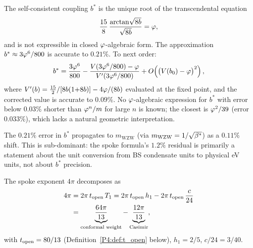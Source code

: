 \begin{proposition}
\label{P4:prop:bstar}
The self-consistent coupling $b^*$ is the unique root of the
transcendental equation
\begin{equation}
  \frac{15}{8}\,\frac{\arctan\!\sqrt{8b}}{\sqrt{8b}} = \varphi,
  \label{P4:eq:bstar_eq}
\end{equation}
and is not expressible in closed $\varphi$-algebraic form.  The approximation
$b^* \approx 3\varphi^6/800$ is accurate to $0.21\%$.  To next order:
\begin{equation}
  b^* = \frac{3\varphi^6}{800} - \frac{V(3\varphi^6/800) - \varphi}{V'(3\varphi^6/800)}
  + O\!\left(\bigl(V(b_0)-\varphi\bigr)^2\right),
  \label{P4:eq:bstar_newton}
\end{equation}
where $V'(b) = \tfrac{15}{2}/[8b(1{+}8b)] - 4\varphi/(8b)$ evaluated at the
fixed point, and the corrected value is accurate to $0.09\%$.
No $\varphi$-algebraic expression for $b^*$ with error below $0.03\%$
shorter than $\varphi^n/m$ for large $n$ is known; the closest is $\varphi^2/39$
(error $0.033\%$), which lacks a natural geometric interpretation.
\end{proposition}

\begin{remark}
\label{P4:rem:spoke_error_contribution}
The $0.21\%$ error in $b^*$ propagates to $m_\mathrm{WZW}$ (via
$m_\mathrm{WZW} = 1/\sqrt{\beta^{*}}$) as a $0.11\%$ shift.  This is
sub-dominant: the spoke formula's $1.2\%$ residual is primarily
a statement about the unit conversion from BS condensate units to
physical eV units, not about $b^*$ precision.
\end{remark}

\begin{proposition}
\label{P4:prop:exponent_decomp}
The spoke exponent $4\pi$ decomposes as
\begin{align}
  4\pi
  &= 2\pi\,t_{\rm open}\,T_1
   = 2\pi\,t_{\rm open}\,h_1
     - 2\pi\,t_{\rm open}\,\frac{c}{24} \notag\\
  &= \underbrace{\frac{64\pi}{13}}_{\text{conformal weight}}
     - \underbrace{\frac{12\pi}{13}}_{\text{Casimir}},
  \label{P4:eq:exponent_decomp}
\end{align}
with $t_{\rm open}=80/13$ (Definition~\ref{P4:def:t_open} below),
$h_1=2/5$, $c/24=3/40$.
\end{proposition}

